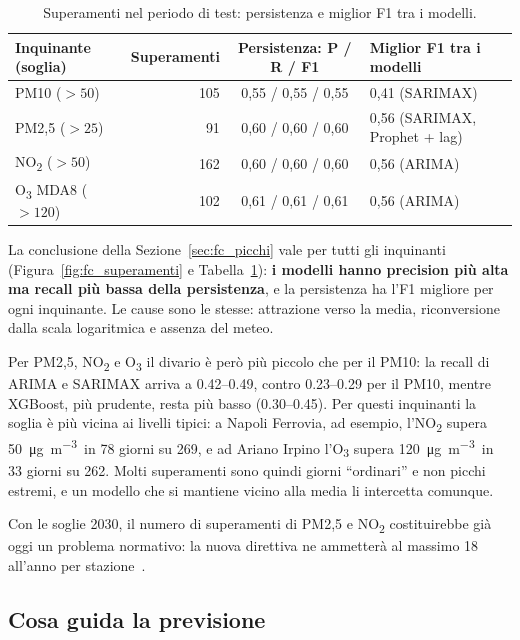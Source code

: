 \documentclass[11pt]{report}
\newcommand{\ugm}{\si{\micro\gram\per\cubic\metre}}
\begin{document}
\begin{table}[H]
  \centering
  \caption{Superamenti nel periodo di test: persistenza e miglior F1 tra i modelli.}
  \label{tab:fc_superamenti}
  \small
  \begin{tabular}{l r c l}
    \toprule
    \textbf{Inquinante (soglia)} & \textbf{Superamenti} & \textbf{Persistenza: P / R / F1} & \textbf{Miglior F1 tra i modelli} \\
    \midrule
    PM10 ($>50$) & 105 & 0,55 / 0,55 / 0,55 & 0,41 (SARIMAX) \\
    PM2,5 ($>25$) & 91 & 0,60 / 0,60 / 0,60 & 0,56 (SARIMAX, Prophet + lag) \\
    NO\textsubscript{2} ($>50$) & 162 & 0,60 / 0,60 / 0,60 & 0,56 (ARIMA) \\
    O\textsubscript{3} MDA8 ($>120$) & 102 & 0,61 / 0,61 / 0,61 & 0,56 (ARIMA) \\
    \bottomrule
  \end{tabular}
\end{table}

La conclusione della Sezione~\ref{sec:fc_picchi} vale per tutti gli inquinanti
(Figura~\ref{fig:fc_superamenti} e Tabella~\ref{tab:fc_superamenti}): \textbf{i
modelli hanno precision più alta ma recall più bassa della persistenza}, e la
persistenza ha l'F1 migliore per ogni inquinante. Le cause sono le stesse: attrazione
verso la media, riconversione dalla scala logaritmica e assenza del meteo.

Per PM2,5, NO\textsubscript{2} e O\textsubscript{3} il divario è però più piccolo che
per il PM10: la recall di ARIMA e SARIMAX arriva a \num{0.42}--\num{0.49}, contro
\num{0.23}--\num{0.29} per il PM10, mentre XGBoost, più prudente, resta più basso
(\num{0.30}--\num{0.45}). Per questi inquinanti la soglia è più vicina ai livelli
tipici: a Napoli Ferrovia, ad esempio, l'NO\textsubscript{2} supera 50~\ugm\ in 78
giorni su 269, e ad Ariano Irpino l'O\textsubscript{3} supera 120~\ugm\ in 33 giorni
su 262. Molti superamenti sono quindi giorni ``ordinari'' e non picchi estremi, e un
modello che si mantiene vicino alla media li intercetta comunque.

Con le soglie 2030, il numero di superamenti di PM2,5 e NO\textsubscript{2}
costituirebbe già oggi un problema normativo: la nuova direttiva ne ammetterà al
massimo 18 all'anno per stazione~\cite{direttiva2024}.

\subsection{Cosa guida la previsione}
\label{sec:fc_altri_importanza}
\end{document}
